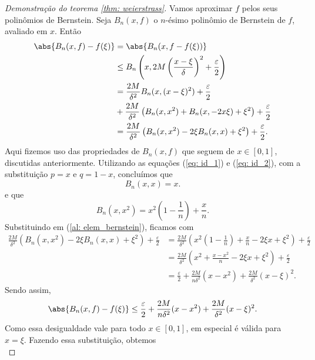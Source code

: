 \begin{proof}[Demonstração do teorema \ref{thm: weierstrass}]
    Vamos aproximar \( f \) pelos seus polinômios de Bernstein.
    Seja \( B_{ n }(x, f) \) o \( n \)-ésimo polinômio de Bernstein de \( f \), avaliado em \( x \).
    Então
    \begin{align}
        \abs{ B_{ n } (x, f) - f(\xi) }
        &= \abs{B_{ n } (x, f - f(\xi))} \notag \\
        &\leq  B_{ n } \left( x, 2M \left( \frac{ x - \xi }{ \delta } \right)^2 + \frac{ \varepsilon }{ 2 } \right) \notag \\
        &= \frac{ 2M }{ \delta^2 } B_{ n } (x, ( x - \xi )^2) + \frac{ \varepsilon }{ 2 } \notag \\
        &+ \frac{ 2M }{ \delta^2 } \left( B_{ n } (x, x^2) + B_{ n } (x, -2 x \xi) + \xi^2 \right) + \frac{ \varepsilon }{ 2 } \notag \\
        &= \frac{ 2M }{ \delta^2 } \left( B_{ n } (x, x^2) - 2 \xi B_{ n } (x, x) + \xi^2 \right) + \frac{ \varepsilon }{ 2 }
        \label{al: elem_bernstein}
    .\end{align}
    Aqui fizemos uso das propriedades de \( B_{ n } (x, f) \) que seguem de \( x \in [0, 1] \), discutidas anteriormente.
    Utilizando as equações (\ref{eq: id_1}) e (\ref{eq: id_2}), com a substituição \( p = x \) e \( q = 1 - x \), concluímos que \[
        B_{ n } (x, x) = x
    .\]
    e que \[
        B_{ n } (x, x^2) = x^2 \left( 1 - \frac{ 1 }{ n } \right) + \frac{ x }{ n }
    .\]
    Substituindo em (\ref{al: elem_bernstein}), ficamos com
    \begin{align*}
        \frac{ 2M }{ \delta^2 } \left( B_{ n } (x, x^2) - 2 \xi B_{ n } (x, x) + \xi^2 \right) + \frac{ \varepsilon }{ 2 } &=
        \frac{ 2M }{ \delta^2 } \left( 
            x^2 \left( 1 - \frac{ 1 }{ n } \right) + \frac{ x }{ n }
            - 2 \xi x
            + \xi^2
         \right) + \frac{ \varepsilon }{ 2 } \\
         &= \frac{ 2M }{ \delta^2 } \left( 
             x^2 + \frac{ x - x^2 }{ n } - 2 \xi x + \xi^2
          \right) + \frac{ \varepsilon }{ 2 } \\
         &= \frac{ \varepsilon }{ 2 } + \frac{ 2M }{ n \delta^2 } ( x - x^2 ) + \frac{ 2M }{ \delta^2 } ( x - \xi )^2
    .\end{align*}
    Sendo assim, \[
        \abs{ B_{ n } (x, f) - f(\xi) } \leq \frac{ \varepsilon }{ 2 } + \frac{ 2M }{ n \delta^2 } ( x - x^2 ) + \frac{ 2M }{ \delta^2 } ( x - \xi )^2
    .\]
    Como essa desigualdade vale para todo \( x \in [0, 1] \), em especial é válida para \( x = \xi \).
    Fazendo essa substituição, obtemos \[
\]
\end{proof}
